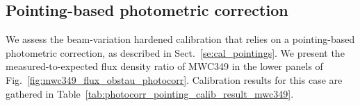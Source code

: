%
%
%
\subsection{Pointing-based photometric correction}


We assess the beam-variation hardened calibration that relies on a
pointing-based photometric correction, as described in Sect.~\ref{se:cal_pointings}.
We present the measured-to-expected flux density ratio of MWC349 in
the lower panels of 
Fig.~\ref{fig:mwc349_flux_obstau_photocorr}. Calibration results
for this case are gathered in Table~\ref{tab:photocorr_pointing_calib_result_mwc349}.





